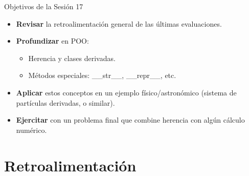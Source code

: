 \documentclass[10pt]{beamer}
\begin{document}
\begin{frame}{Objetivos de la Sesión 17}
  \begin{itemize}
    \item \textbf{Revisar} la retroalimentación general de las últimas evaluaciones.
    \item \textbf{Profundizar} en POO:
      \begin{itemize}
        \item Herencia y clases derivadas.
        \item Métodos especiales: \_\_str\_\_, \_\_repr\_\_, etc.
      \end{itemize}
    \item \textbf{Aplicar} estos conceptos en un ejemplo físico/astronómico (sistema de partículas derivadas, o similar).
    \item \textbf{Ejercitar} con un problema final que combine herencia con algún cálculo numérico.
  \end{itemize}
\end{frame}

\section{Retroalimentación}
\end{document}
